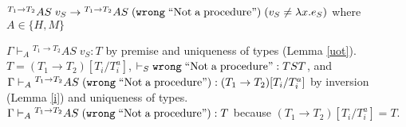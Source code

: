 \begin{case}
$^{T_{1}\rightarrow T_{2}}AS\;v_{S}\rightarrow{^{T_{1}\rightarrow T_{2}}A}S\;(\mathtt{wrong}\;\mathrm{``Not\;a\;procedure"})\;(v_{S}\neq\lambda x.e_{S})$ where $A\in\lbrace H,M\rbrace$

$\Gamma\vdash_{A}{^{T_{1}\rightarrow T_{2}}A}S\;v_{S}:T$ by premise and uniqueness of types (Lemma \ref{uot}).  $T=(T_{1}\rightarrow T_{2})[T_{i}/T_{i}^{a}]$, $\vdash_{S}\mathtt{wrong}\;\mathrm{``Not\;a\;procedure"}:TST$, and $\Gamma\vdash_{A}{^{T_{1}\rightarrow T_{2}}A}S\;(\mathtt{wrong}\;\mathrm{``Not\;a\;procedure"}):(T_{1}\rightarrow T_{2})[T_{i}/T_{i}^{a}]$ by inversion (Lemma \ref{i}) and uniqueness of types.  $\Gamma\vdash_{A}{^{T_{1}\rightarrow T_{2}}A}S\;(\mathtt{wrong}\;\mathrm{``Not\;a\;procedure"}):T$ because $(T_{1}\rightarrow T_{2})[T_{i}/T_{i}^{a}]=T$.
\end{case}